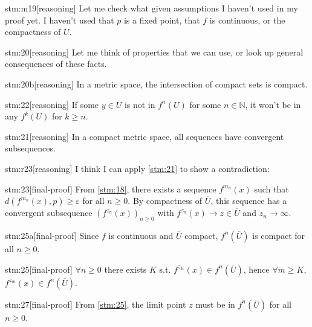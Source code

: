 \begin{stm}{stm:m19}[reasoning]
Let me check what given assumptions I haven't used in my proof yet. I haven't used that $p$ is a fixed point, that $f$ is continuous, or the compactness of $\overline{U}$.
\end{stm}

\begin{stm}{stm:20}[reasoning]
Let me think of properties that we can use, or look up general consequences of these facts.
\end{stm}

\begin{stm}{stm:20b}[reasoning]
 In a metric space, the intersection of compact sets is compact.
\end{stm}

\begin{stm}{stm:22}[reasoning]
    If some $y \in U$ is not in $f^n(U)$ for some $n \in \mathbb{N}$, it won't be in any $f^k(U)$ for $k \ge n$.
\end{stm}

\begin{stm}{stm:21}[reasoning]
In a compact metric space, all sequences have convergent subsequences.
\end{stm}

\begin{stm}{stm:r23}[reasoning]
I think I can apply \ref{stm:21} to show a contradiction: 
\end{stm}

\begin{stm}{stm:23}[final-proof]
From \ref{stm:18}, there exists a sequence $f^{m_n}(x)$ such that $d(f^{m_n}(x), p) \ge \varepsilon$ for all $n \ge 0$. By compactness of $\overline{U}$, this sequence has a convergent subsequence $(f^{z_n}(x))_{n \ge 0}$ with $f^{z_n}(x) \to z \in \overline{U}$ and $z_n \to \infty$.
\end{stm}

\begin{stm}{stm:25a}[final-proof]
Since $f$ is continuous and $\overline{U}$ compact, $f^n(\overline{U})$ is compact for all $n \ge 0$. 
\end{stm}

\begin{stm}{stm:25}[final-proof]
$\forall n \ge 0$ there exists $K$ s.t. $f^{z_K}(x) \in f^n(\overline{U})$, hence $\forall m \ge K$, $f^{z_m}(x) \in f^n(\overline{U})$.
\end{stm}

\begin{stm}{stm:27}[final-proof]
From \ref{stm:25}, the limit point $z$ must be in $f^n(\overline{U})$ for all $n \ge 0$.
\end{stm}

